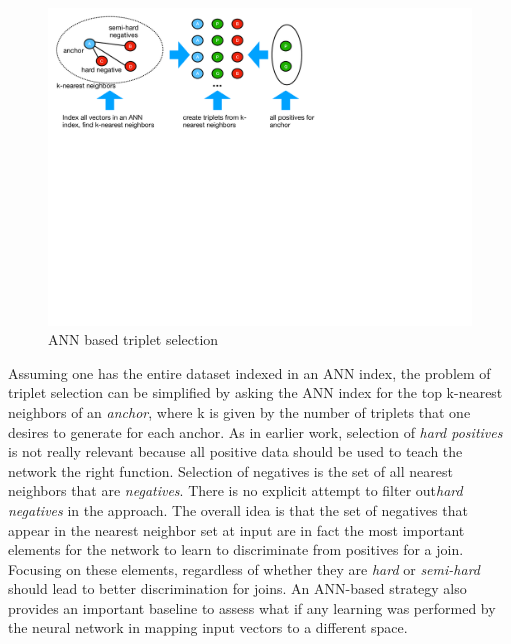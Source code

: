 \begin{figure}
\includegraphics[width=1.0\linewidth]{ANN_selection}
\caption{ANN based triplet selection}
\label{ANN_selection}
\end{figure}

Assuming one has the entire dataset indexed in an ANN index, the problem of triplet selection can be simplified by asking the ANN index for the top k-nearest neighbors of an \textit{anchor}, where k is given by the number of triplets that one desires to generate for each anchor.  As in earlier work, selection of \textit{hard positives} is not really relevant because all positive data should be used to teach the network the right function.  Selection of negatives is the set of all nearest neighbors that are \textit{negatives}.  There is no explicit attempt to filter out\textit{hard negatives} in the approach.  The overall idea is that the set of negatives that appear in the nearest neighbor set at input are in fact the most important elements for the network to learn to discriminate from positives for a join.  Focusing on these elements, regardless of whether they are \textit{hard} or \textit{semi-hard} should lead to better discrimination for joins.  An ANN-based strategy also provides an important baseline to assess what if any learning was performed by the neural network in mapping input vectors to a different space.
